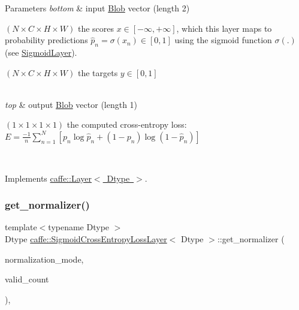 \begin{DoxyParams}{Parameters}
{\em bottom} & input \mbox{\hyperlink{classcaffe_1_1_blob}{Blob}} vector (length 2)
\begin{DoxyEnumerate}
\item $ (N \times C \times H \times W) $ the scores $ x \in [-\infty, +\infty]$, which this layer maps to probability predictions $ \hat{p}_n = \sigma(x_n) \in [0, 1] $ using the sigmoid function $ \sigma(.) $ (see \mbox{\hyperlink{classcaffe_1_1_sigmoid_layer}{Sigmoid\+Layer}}).
\item $ (N \times C \times H \times W) $ the targets $ y \in [0, 1] $ 
\end{DoxyEnumerate}\\
\hline
{\em top} & output \mbox{\hyperlink{classcaffe_1_1_blob}{Blob}} vector (length 1)
\begin{DoxyEnumerate}
\item $ (1 \times 1 \times 1 \times 1) $ the computed cross-\/entropy loss\+: $ E = \frac{-1}{n} \sum\limits_{n=1}^N \left[ p_n \log \hat{p}_n + (1 - p_n) \log(1 - \hat{p}_n) \right] $ 
\end{DoxyEnumerate}\\
\hline
\end{DoxyParams}


Implements \mbox{\hyperlink{classcaffe_1_1_layer_a576ac6a60b1e99fe383831f52a6cea77}{caffe\+::\+Layer$<$ Dtype $>$}}.

\mbox{\label{classcaffe_1_1_sigmoid_cross_entropy_loss_layer_af8ce9b84227c0be01d4a1cc248a7aa52}} 
\subsubsection{\texorpdfstring{get\+\_\+normalizer()}{get\_normalizer()}\hspace{0.1cm}{\footnotesize\ttfamily [1/2]}}
{\footnotesize\ttfamily template$<$typename Dtype $>$ \\
Dtype \mbox{\hyperlink{classcaffe_1_1_sigmoid_cross_entropy_loss_layer}{caffe\+::\+Sigmoid\+Cross\+Entropy\+Loss\+Layer}}$<$ Dtype $>$\+::get\+\_\+normalizer (\begin{DoxyParamCaption}\item[{Loss\+Parameter\+\_\+\+Normalization\+Mode}]{normalization\+\_\+mode,  }\item[{int}]{valid\+\_\+count }\end{DoxyParamCaption})\hspace{0.3cm}{\ttfamily [protected]}, {\ttfamily [virtual]}}

